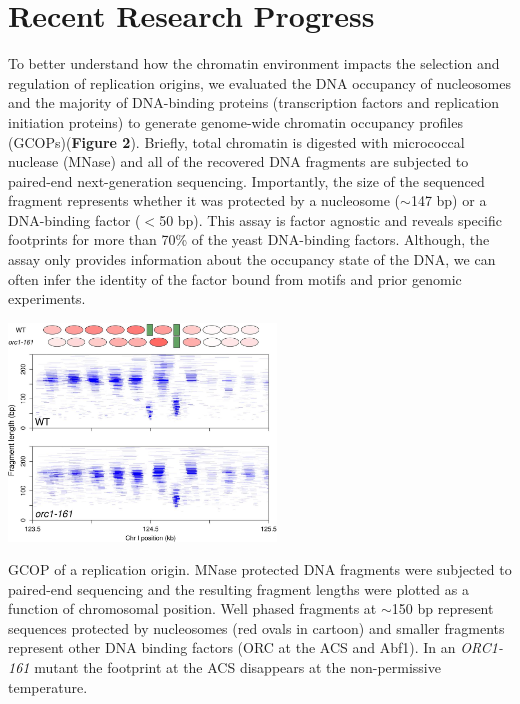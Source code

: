 \section{Recent Research Progress}
To better understand how the chromatin environment impacts the selection and regulation of replication origins, we evaluated the DNA occupancy of nucleosomes and the majority of DNA-binding proteins (\eg transcription factors and replication initiation proteins) to generate genome-wide chromatin occupancy profiles (GCOPs)({\color{dukeblue}\textbf{Figure 2}}). Briefly, total chromatin is digested with micrococcal nuclease (MNase) and all of the recovered DNA fragments are subjected to paired-end next-generation sequencing\citep{Belsky2015-li,Henikoff2011-vo}.  Importantly, the size of the sequenced fragment represents whether it was protected by a nucleosome ($\sim$147 bp) or a DNA-binding factor ($<$50 bp). This assay is factor agnostic and reveals specific footprints for more than 70\% of the yeast DNA-binding factors\citep{Henikoff2011-vo}.  Although, the assay only provides information about the occupancy state of the DNA, we can often infer the identity of the factor bound from motifs and prior genomic experiments.  
\begin{floatingfigure}[lt]{2.8in}
\vspace{-8mm}
\begin{center}
\includegraphics[width=2.8in]{r35_figures/orc_chromatin_gcop.png}
\end{center}
\vspace{3mm}
\caption{GCOP of a replication origin.  MNase protected DNA fragments were subjected to paired-end sequencing and the resulting fragment lengths were plotted as a function of chromosomal position.  Well phased fragments at $\sim$150 bp represent sequences protected by nucleosomes (red ovals in cartoon) and smaller fragments represent other DNA binding factors (\eg ORC at the ACS and Abf1).  In an \textit{ORC1-161} mutant the footprint at the ACS disappears at the non-permissive temperature.}%
\end{floatingfigure}%
